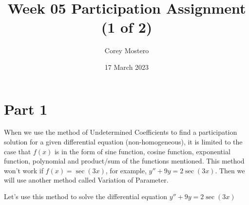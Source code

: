 \documentclass{article}
\title{Week 05 Participation Assignment (1 of 2)}
\date{17 March 2023}
\author{Corey Mostero}
\begin{document}
\newcommand{\hr}{\par\noindent\rule{\textwidth}{0.4pt}}

\newcommand{\bc}[1]{
	\begin{equation*}
		\begin{boxed}
			{#1}
		\end{boxed}
	\end{equation*}
}

\newcommand{\cond}[2]{
	\ifmmode
		{#1} \quad {#2}
	\else
		$$ {#1} \quad {#2} $$
	\fi
}

\maketitle
\newpage

\tableofcontents

\section{Part 1}
When we use the method of Undetermined Coefficients to find a participation solution for a given differential equation (non-homogeneous), it is limited to the case that $ f(x) $  is in the form of sine function, cosine function, exponential function, polynomial and product/sum of the functions mentioned. This method won't work if $ f(x) = \sec(3x) $, for example, $ y'' + 9y = 2\sec(3x) $. Then we will use another method called Variation of Parameter.

Let's use this method to solve the differential equation $ y'' + 9y = 2\sec(3x) $
\end{document}
